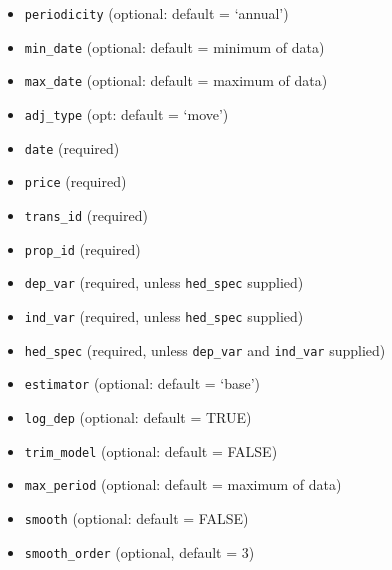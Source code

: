 \documentclass[]{article}
\providecommand{\tightlist}{%
  \setlength{\itemsep}{0pt}\setlength{\parskip}{0pt}}
\begin{document}
\begin{itemize}
\tightlist
\item
  \texttt{periodicity} (optional: default = `annual')
\item
  \texttt{min\_date} (optional: default = minimum of data)
\item
  \texttt{max\_date} (optional: default = maximum of data)
\item
  \texttt{adj\_type} (opt: default = `move')
\item
  \texttt{date} (required)
\item
  \texttt{price} (required)
\item
  \texttt{trans\_id} (required)
\item
  \texttt{prop\_id} (required)
\item
  \texttt{dep\_var} (required, unless \texttt{hed\_spec} supplied)
\item
  \texttt{ind\_var} (required, unless \texttt{hed\_spec} supplied)
\item
  \texttt{hed\_spec} (required, unless \texttt{dep\_var} and
  \texttt{ind\_var} supplied)
\item
  \texttt{estimator} (optional: default = `base')
\item
  \texttt{log\_dep} (optional: default = TRUE)
\item
  \texttt{trim\_model} (optional: default = FALSE)
\item
  \texttt{max\_period} (optional: default = maximum of data)
\item
  \texttt{smooth} (optional: default = FALSE)
\item
  \texttt{smooth\_order} (optional, default = 3)
\end{itemize}
\end{document}
